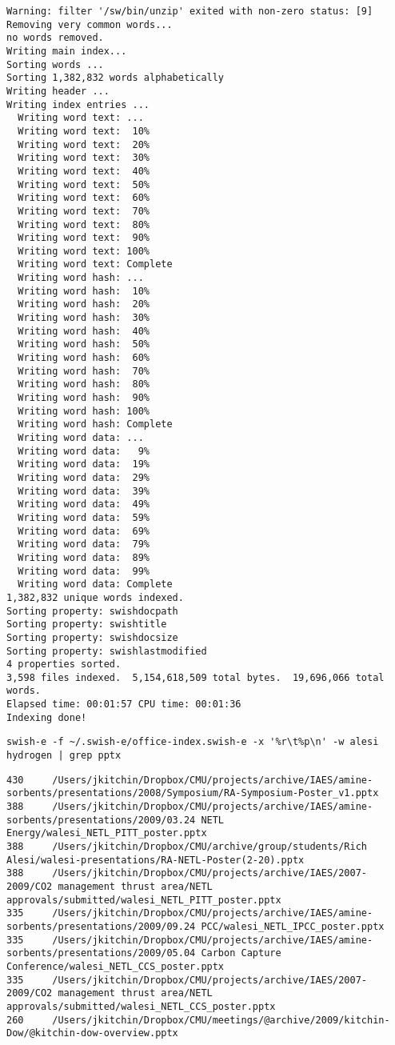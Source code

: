 \documentclass[11pt]{article}
\begin{document}
\begin{verbatim}
Warning: filter '/sw/bin/unzip' exited with non-zero status: [9]
Removing very common words...
no words removed.
Writing main index...
Sorting words ...
Sorting 1,382,832 words alphabetically
Writing header ...
Writing index entries ...
  Writing word text: ...
  Writing word text:  10%
  Writing word text:  20%
  Writing word text:  30%
  Writing word text:  40%
  Writing word text:  50%
  Writing word text:  60%
  Writing word text:  70%
  Writing word text:  80%
  Writing word text:  90%
  Writing word text: 100%
  Writing word text: Complete
  Writing word hash: ...
  Writing word hash:  10%
  Writing word hash:  20%
  Writing word hash:  30%
  Writing word hash:  40%
  Writing word hash:  50%
  Writing word hash:  60%
  Writing word hash:  70%
  Writing word hash:  80%
  Writing word hash:  90%
  Writing word hash: 100%
  Writing word hash: Complete
  Writing word data: ...
  Writing word data:   9%
  Writing word data:  19%
  Writing word data:  29%
  Writing word data:  39%
  Writing word data:  49%
  Writing word data:  59%
  Writing word data:  69%
  Writing word data:  79%
  Writing word data:  89%
  Writing word data:  99%
  Writing word data: Complete
1,382,832 unique words indexed.
Sorting property: swishdocpath                            
Sorting property: swishtitle                              
Sorting property: swishdocsize                            
Sorting property: swishlastmodified                       
4 properties sorted.
3,598 files indexed.  5,154,618,509 total bytes.  19,696,066 total words.
Elapsed time: 00:01:57 CPU time: 00:01:36
Indexing done!
\end{verbatim}





\begin{verbatim}
swish-e -f ~/.swish-e/office-index.swish-e -x '%r\t%p\n' -w alesi hydrogen | grep pptx
\end{verbatim}

\begin{verbatim}
430     /Users/jkitchin/Dropbox/CMU/projects/archive/IAES/amine-sorbents/presentations/2008/Symposium/RA-Symposium-Poster_v1.pptx
388     /Users/jkitchin/Dropbox/CMU/projects/archive/IAES/amine-sorbents/presentations/2009/03.24 NETL Energy/walesi_NETL_PITT_poster.pptx
388     /Users/jkitchin/Dropbox/CMU/archive/group/students/Rich Alesi/walesi-presentations/RA-NETL-Poster(2-20).pptx
388     /Users/jkitchin/Dropbox/CMU/projects/archive/IAES/2007-2009/CO2 management thrust area/NETL approvals/submitted/walesi_NETL_PITT_poster.pptx
335     /Users/jkitchin/Dropbox/CMU/projects/archive/IAES/amine-sorbents/presentations/2009/09.24 PCC/walesi_NETL_IPCC_poster.pptx
335     /Users/jkitchin/Dropbox/CMU/projects/archive/IAES/amine-sorbents/presentations/2009/05.04 Carbon Capture Conference/walesi_NETL_CCS_poster.pptx
335     /Users/jkitchin/Dropbox/CMU/projects/archive/IAES/2007-2009/CO2 management thrust area/NETL approvals/submitted/walesi_NETL_CCS_poster.pptx
260     /Users/jkitchin/Dropbox/CMU/meetings/@archive/2009/kitchin-Dow/@kitchin-dow-overview.pptx
\end{verbatim}
\end{document}
